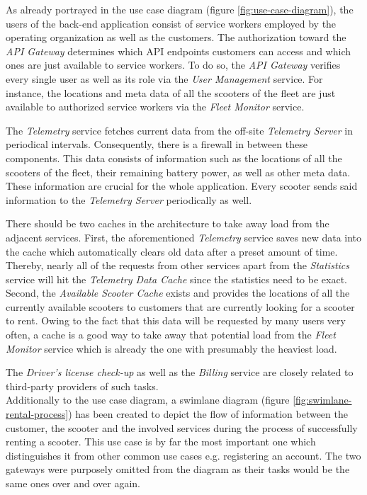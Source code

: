 \documentclass[12pt,a4paper,twoside]{report}
\begin{document}
As already portrayed in the use case diagram (figure \ref{fig:use-case-diagram}),
the users of the back-end application consist of service workers employed
by the operating organization as well as the customers.
The authorization toward the \textit{API Gateway} determines which
API endpoints customers can access and which ones are just available to
service workers. To do so, the \textit{API Gateway} verifies every single user
as well as its role via the \textit{User Management} service.
For instance, the locations and meta data of all the scooters
of the fleet are just available to authorized service workers via the
\textit{Fleet Monitor} service.

The \textit{Telemetry} service fetches current data from the
off-site \textit{Telemetry Server} in periodical intervals.
Consequently, there is a firewall in between these components.
This data consists of information such as the locations of all the scooters
of the fleet, their remaining battery power, as well as other meta data.
These information are crucial for the whole application.
Every scooter sends said information to the \textit{Telemetry Server}
periodically as well.

There should be two caches in the architecture to take away load from the
adjacent services. First, the aforementioned \textit{Telemetry}
service saves new data into the cache which automatically clears old
data after a preset amount of time. Thereby, nearly all of the requests from
other services apart from the \textit{Statistics} service will hit the
\textit{Telemetry Data Cache} since the statistics need to be exact.\\
Second, the \textit{Available Scooter Cache} exists and provides the locations
of all the currently available scooters to customers that are currently looking
for a scooter to rent. Owing to the fact that this data will be requested by
many users very often, a cache is a good way to take away that potential load
from the \textit{Fleet Monitor} service which is already the one with
presumably the heaviest load.

The \textit{Driver's license check-up} as well as the \textit{Billing} service
are closely related to third-party providers of such tasks.\\

Additionally to the use case diagram, a swimlane diagram
(figure \ref{fig:swimlane-rental-process}) has been created to depict
the flow of information between the customer, the scooter and the
involved services during the process of successfully renting a scooter.
This use case is by far the most important one which distinguishes it
from other common use cases e.g. registering an account.
The two gateways were purposely omitted from the diagram as their tasks would
be the same ones over and over again.
\end{document}
